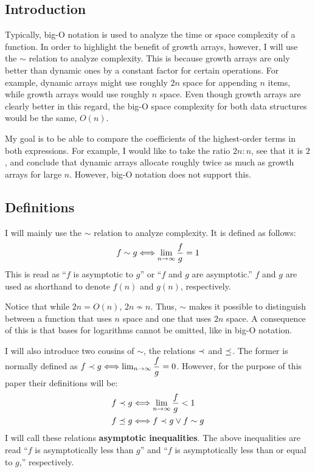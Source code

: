 \subsection{Introduction}

Typically, big-O notation is used to analyze the time or space complexity of a function. In order to highlight the benefit of growth arrays, however, I will use the $\sim$ relation to analyze complexity. This is because growth arrays are only better than dynamic ones by a constant factor for certain operations. For example, dynamic arrays might use roughly $2n$ space for appending $n$ items, while growth arrays would use roughly $n$ space. Even though growth arrays are clearly better in this regard, the big-O space complexity for both data structures would be the same, $O(n)$.

My goal is to be able to compare the coefficients of the highest-order terms in both expressions. For example, I would like to take the ratio $2n : n$, see that it is $2$, and conclude that dynamic arrays allocate roughly twice as much as growth arrays for large $n$. However, big-O notation does not support this.

\subsection{Definitions}

I will mainly use the $\sim$ relation to analyze complexity. It is defined as follows:
\begin{align*}
f \sim g \Longleftrightarrow \lim_{n \to \infty} \frac f g = 1
\end{align*}
This is read as ``$f$ is asymptotic to $g$'' or ``$f$ and $g$ are asymptotic.'' {\HdrNote} $f$ and $g$ are used as shorthand to denote $f(n)$ and $g(n)$, respectively.

Notice that while $2n = O(n)$, $2n \not\sim n$. Thus, $\sim$ makes it possible to distinguish between a function that uses $n$ space and one that uses $2n$ space. {\HdrNote} A consequence of this is that bases for logarithms cannot be omitted, like in big-O notation.

I will also introduce two cousins of $\sim$, the relations $\prec$ and $\preceq$. The former is normally defined as $f \prec g \Longleftrightarrow \lim_{n \to \infty} \dfrac{f}{g} = 0$. However, for the purpose of this paper their definitions will be:
\begin{align*}
f \prec g &\Longleftrightarrow \lim_{n \to \infty} \frac f g < 1\\
f \preceq g &\Longleftrightarrow f \prec g \lor f \sim g
\end{align*}
I will call these relations \textbf{asymptotic inequalities}. The above inequalities are read ``$f$ is asymptotically less than $g$'' and ``$f$ is asymptotically less than or equal to $g$,'' respectively.


